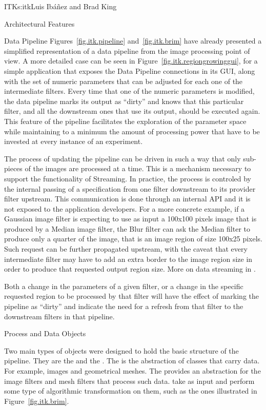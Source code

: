\begin{aosachapter}{ITK}{s:itk}{Luis Ib\'{a}\~{n}ez and Brad King}
\begin{aosasect1}{Architectural Features}
\begin{aosasect2}{Data Pipeline}
Figures~\ref{fig.itk.pipeline} and~\ref{fig.itk.brim} have already presented a
simplified representation of a data pipeline from the image processing point of
view. A more detailed case can be seen in
Figure~\ref{fig.itk.regiongrowinggui}, for a simple application that exposes
the Data Pipeline connections in its GUI, along with the set of numeric
parameters that can be adjusted for each one of the intermediate filters. Every
time that one of the numeric parameters is modified, the data pipeline marks
its output as ``dirty'' and knows that this particular filter, and all the
downstream ones that use its output, should be executed again. This feature of
the pipeline facilitates the exploration of the parameter space while
maintaining to a minimum the amount of processing power that have to be
invested at every instance of an experiment.

The process of updating the pipeline can be driven in such a way that only
sub-pieces of the images are processed at a time. This is a mechanism necessary
to support the functionality of Streaming. In practice, the process is
controled by the internal passing of a  specification
from one filter downstream to its provider filter upstream. This communication
is done through an internal API and it is not exposed to the application
developers. For a more concrete example, if a Gaussian image filter is
expecting to use as input a 100x100 pixels image that is produced by a Median
image filter, the Blur filter can ask the Median filter to produce only a
quarter of the image, that is an image region of size 100x25 pixels.  Such
request can be further propagated upstream, with the caveat that every
intermediate filter may have to add an extra border to the image region size in
order to produce that requested output region size.
More on data streaming in .

Both a change in the parameters of a given filter, or a change in the
specific requested region to be processed by that filter will have the
effect of marking the pipeline as ``dirty'' and indicate the need for
a refresh from that filter to the downstream filters in that pipeline.

\begin{aosasect3}{Process and Data Objects}

Two main types of objects were designed to hold the basic structure of the
pipeline.  They are the  and the . The
 is the abstraction of classes that carry data. For example,
images and geometrical meshes. The  provides an abstraction
for the image filters and mesh filters that process such data.
 take  as input and perform some type of
algorithmic transformation on them, such as the ones illustrated in
Figure~\ref{fig.itk.brim}.


\end{aosasect3}
\end{aosasect2}
\end{aosasect1}
\end{aosachapter}
